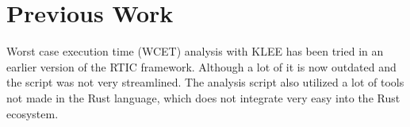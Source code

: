 \section{Previous Work}
Worst case execution time (WCET) analysis with KLEE has been tried in an earlier
version of the RTIC framework\cite{lindner}. Although a lot of it is now
outdated and the script was not very streamlined. The analysis script also 
utilized a lot of tools not made in the Rust language, which does not integrate
very easy into the Rust ecosystem.

